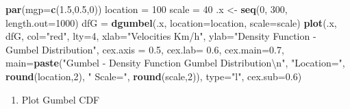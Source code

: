 \documentclass[12pt,twoside]{reedthesis}
\newenvironment{Shaded}{\begin{snugshade}}{\end{snugshade}}
\newcommand{\CharTok}[1]{\textcolor[rgb]{0.31,0.60,0.02}{#1}}
\newcommand{\DataTypeTok}[1]{\textcolor[rgb]{0.13,0.29,0.53}{#1}}
\newcommand{\DecValTok}[1]{\textcolor[rgb]{0.00,0.00,0.81}{#1}}
\newcommand{\FloatTok}[1]{\textcolor[rgb]{0.00,0.00,0.81}{#1}}
\newcommand{\KeywordTok}[1]{\textcolor[rgb]{0.13,0.29,0.53}{\textbf{#1}}}
\newcommand{\NormalTok}[1]{#1}
\newcommand{\StringTok}[1]{\textcolor[rgb]{0.31,0.60,0.02}{#1}}
\providecommand{\tightlist}{%
  \setlength{\itemsep}{0pt}\setlength{\parskip}{0pt}}
\begin{document}
\begin{Shaded}
\begin{Highlighting}[]
\KeywordTok{par}\NormalTok{(}\DataTypeTok{mgp=}\KeywordTok{c}\NormalTok{(}\FloatTok{1.5}\NormalTok{,}\FloatTok{0.5}\NormalTok{,}\DecValTok{0}\NormalTok{))}
\NormalTok{location =}\StringTok{ }\DecValTok{100}
\NormalTok{scale =}\StringTok{ }\DecValTok{40}
\NormalTok{.x <-}\StringTok{ }\KeywordTok{seq}\NormalTok{(}\DecValTok{0}\NormalTok{, }\DecValTok{300}\NormalTok{, }\DataTypeTok{length.out=}\DecValTok{1000}\NormalTok{)}
\NormalTok{dfG =}\StringTok{ }\KeywordTok{dgumbel}\NormalTok{(.x, }\DataTypeTok{location=}\NormalTok{location, }\DataTypeTok{scale=}\NormalTok{scale)}
\KeywordTok{plot}\NormalTok{(.x, dfG, }\DataTypeTok{col=}\StringTok{"red"}\NormalTok{, }\DataTypeTok{lty=}\DecValTok{4}\NormalTok{, }\DataTypeTok{xlab=}\StringTok{"Velocities Km/h"}\NormalTok{, }\DataTypeTok{ylab=}\StringTok{"Density Function - Gumbel Distribution"}\NormalTok{, }\DataTypeTok{cex.axis =} \FloatTok{0.5}\NormalTok{, }\DataTypeTok{cex.lab=} \FloatTok{0.6}\NormalTok{, }\DataTypeTok{cex.main=}\FloatTok{0.7}\NormalTok{,}
 \DataTypeTok{main=}\KeywordTok{paste}\NormalTok{(}\StringTok{"Gumbel - Density Function Gumbel Distribution}\CharTok{\textbackslash{}n}\StringTok{"}\NormalTok{, }\StringTok{"Location="}\NormalTok{, }\KeywordTok{round}\NormalTok{(location,}\DecValTok{2}\NormalTok{), }\StringTok{" Scale="}\NormalTok{, }\KeywordTok{round}\NormalTok{(scale,}\DecValTok{2}\NormalTok{)), }\DataTypeTok{type=}\StringTok{"l"}\NormalTok{, }\DataTypeTok{cex.sub=}\FloatTok{0.6}\NormalTok{)}
\end{Highlighting}
\end{Shaded}
\normalsize
\begin{enumerate}
\def\labelenumi{\arabic{enumi}.}
\setcounter{enumi}{2}
\tightlist
\item
  Plot Gumbel CDF
\end{enumerate}
\tiny
\end{document}
